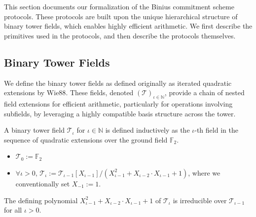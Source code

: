 This section documents our formalization of the Binius commitment scheme protocols. These protocols are built upon the unique hierarchical structure of binary tower fields, which enables highly efficient arithmetic. We first describe the primitives used in the protocols, and then describe the protocols themselves.

\subsection{Binary Tower Fields}

We define the binary tower fields \cite{DP25} as defined originally as iterated quadratic extensions by Wie88\cite{Wie88}. These fields, denoted $(\mathcal{T})_{\iota \in \mathbb{N}}$, provide a chain of nested field extensions for efficient arithmetic, particularly for operations involving subfields, by leveraging a highly compatible basis structure across the tower.

\begin{definition}
    \label{def:binary_tower_field}
    A binary tower field $\mathcal{T}_{\iota}$ for $\iota \in \mathbb{N}$ is defined inductively as the $\iota$-th field in the sequence of quadratic extensions over the ground field $\mathbb{F}_2$.
    \begin{itemize}
        \item $\mathcal{T}_{0} := \mathbb{F}_{2}$
        \item $\forall \iota > 0$, $\mathcal{T}_{\iota} := \mathcal{T}_{\iota-1}[X_{\iota-1}] / (X_{\iota-1}^{2}+X_{\iota-2} \cdot X_{\iota-1}+1)$, where we conventionally set $X_{-1} := 1$.
    \end{itemize}
\end{definition}

\begin{theorem}
    \label{thm:binary_tower_field_irreducible}
    The defining polynomial $X_{\iota-1}^{2}+X_{\iota-2} \cdot X_{\iota-1}+1$ of $\mathcal{T}_{\iota}$ is irreducible over $\mathcal{T}_{\iota-1}$ for all $\iota > 0$.
\end{theorem}

